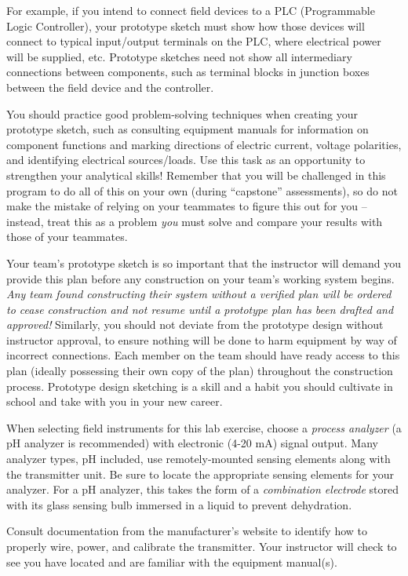 For example, if you intend to connect field devices to a PLC (Programmable Logic Controller), your prototype sketch must show how those devices will connect to typical input/output terminals on the PLC, where electrical power will be supplied, etc.  Prototype sketches need not show all intermediary connections between components, such as terminal blocks in junction boxes between the field device and the controller.

You should practice good problem-solving techniques when creating your prototype sketch, such as consulting equipment manuals for information on component functions and marking directions of electric current, voltage polarities, and identifying electrical sources/loads.  Use this task as an opportunity to strengthen your analytical skills!  Remember that you will be challenged in this program to do all of this on your own (during ``capstone'' assessments), so do not make the mistake of relying on your teammates to figure this out for you -- instead, treat this as a problem {\it you} must solve and compare your results with those of your teammates.

Your team's prototype sketch is so important that the instructor will demand you provide this plan before any construction on your team's working system begins.  {\it Any team found constructing their system without a verified plan will be ordered to cease construction and not resume until a prototype plan has been drafted and approved!}  Similarly, you should not deviate from the prototype design without instructor approval, to ensure nothing will be done to harm equipment by way of incorrect connections.  Each member on the team should have ready access to this plan (ideally possessing their own copy of the plan) throughout the construction process.  Prototype design sketching is a skill and a habit you should cultivate in school and take with you in your new career.

\vskip 10pt

When selecting field instruments for this lab exercise, choose a {\it process analyzer} (a pH analyzer is recommended) with electronic (4-20 mA) signal output.  Many analyzer types, pH included, use remotely-mounted sensing elements along with the transmitter unit.  Be sure to locate the appropriate sensing elements for your analyzer.  For a pH analyzer, this takes the form of a {\it combination electrode} stored with its glass sensing bulb immersed in a liquid to prevent dehydration.

Consult documentation from the manufacturer's website to identify how to properly wire, power, and calibrate the transmitter.  Your instructor will check to see you have located and are familiar with the equipment manual(s).

